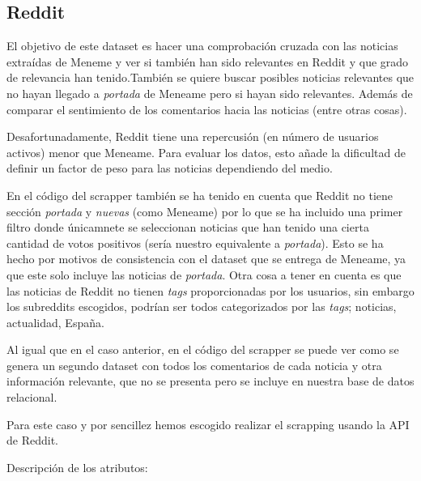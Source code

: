 \documentclass[a4paper,12pt]{article}
\begin{document}
\subsection{Reddit}

El objetivo de este dataset es hacer una comprobaci\'on cruzada con las noticias extra\'idas de Meneme y ver si tambi\'en han sido relevantes en Reddit y que grado de relevancia han tenido.Tambi\'en se quiere buscar posibles noticias relevantes que no hayan llegado a {\itshape portada} de Meneame pero si hayan sido relevantes. Adem\'as de comparar el sentimiento de los comentarios hacia las noticias (entre otras cosas).

Desafortunadamente, Reddit tiene una repercusi\'on (en n\'umero de usuarios activos) menor que Meneame. Para evaluar los datos, esto a\~nade la dificultad de definir un factor de peso para las noticias dependiendo del medio.

En el c\'odigo del scrapper tambi\'en se ha tenido en cuenta que Reddit no tiene secci\'on {\itshape portada} y {\itshape nuevas} (como Meneame) por lo que se ha incluido una primer filtro donde \'unicamnete se seleccionan noticias que han tenido una cierta cantidad de votos positivos (ser\'ia nuestro equivalente a {\itshape portada}). Esto se ha hecho por motivos de consistencia con el dataset que se entrega de Meneame, ya que este solo incluye las noticias de {\itshape portada}. Otra cosa a tener en cuenta es que las noticias de Reddit no tienen {\itshape tags} proporcionadas por los usuarios, sin embargo los subreddits escogidos, podr\'ian ser todos categorizados por las {\itshape tags}; noticias, actualidad, Espa\~na.

Al igual que en el caso anterior, en el c\'odigo del scrapper se puede ver como se genera un segundo dataset con todos los comentarios de cada noticia y otra informaci\'on relevante, que no se presenta pero se incluye en nuestra base de datos relacional.  

Para este caso y por sencillez hemos escogido realizar el scrapping usando la API de Reddit.


Descripci\'on de los atributos:
\end{document}
